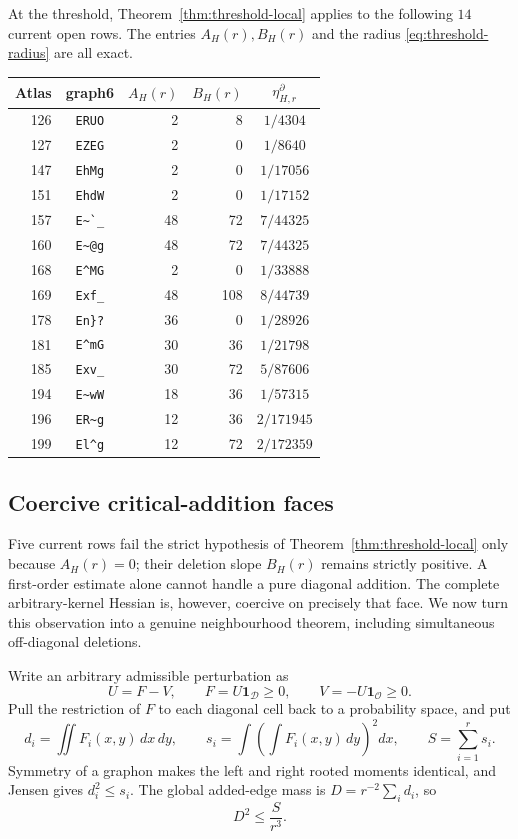 \documentclass[11pt]{article}
\begin{document}
At the threshold, Theorem~\ref{thm:threshold-local} applies to the following
$14$ current open rows.  The entries $A_H(r),B_H(r)$ and the radius
\eqref{eq:threshold-radius} are all exact.

\begin{center}
\begin{tabular}{r|c|r|r|c}
Atlas&graph6&$A_H(r)$&$B_H(r)$&$\eta^{\partial}_{H,r}$\\ \hline
126&\verb|ERUO|&2&8&$1/4304$\\
127&\verb|EZEG|&2&0&$1/8640$\\
147&\verb|EhMg|&2&0&$1/17056$\\
151&\verb|EhdW|&2&0&$1/17152$\\
157&\verb|E~`_|&48&72&$7/44325$\\
160&\verb|E~@g|&48&72&$7/44325$\\
168&\verb|E^MG|&2&0&$1/33888$\\
169&\verb|Exf_|&48&108&$8/44739$\\
178&\verb|En}?|&36&0&$1/28926$\\
181&\verb|E^mG|&30&36&$1/21798$\\
185&\verb|Exv_|&30&72&$5/87606$\\
194&\verb|E~wW|&18&36&$1/57315$\\
196&\verb|ER~g|&12&36&$2/171945$\\
199&\verb|El^g|&12&72&$2/172359$
\end{tabular}
\end{center}

\subsection{Coercive critical-addition faces}

Five current rows fail the strict hypothesis of
Theorem~\ref{thm:threshold-local} only because $A_H(r)=0$; their deletion
slope $B_H(r)$ remains strictly positive.  A first-order estimate alone cannot
handle a pure diagonal addition.  The complete arbitrary-kernel Hessian is,
however, coercive on precisely that face.  We now turn this observation into
a genuine neighbourhood theorem, including simultaneous off-diagonal
deletions.

Write an arbitrary admissible perturbation as
\[
 U=F-V,
 \qquad F=U\mathbf 1_{\mathcal D}\geq0,
 \qquad V=-U\mathbf 1_{\mathcal O}\geq0.
\]
Pull the restriction of $F$ to each diagonal cell back to a probability
space, and put
\[
 d_i=\iint F_i(x,y)\,dx\,dy,
 \qquad
 s_i=\int\left(\int F_i(x,y)\,dy\right)^2dx,
 \qquad S=\sum_{i=1}^r s_i.
\]
Symmetry of a graphon makes the left and right rooted moments identical, and
Jensen gives $d_i^2\leq s_i$.  The global added-edge mass is
$D=r^{-2}\sum_i d_i$, so
\begin{equation}
 D^2\leq \frac{S}{r^3}.
 \label{eq:critical-pair-disjoint}
\end{equation}
\end{document}
